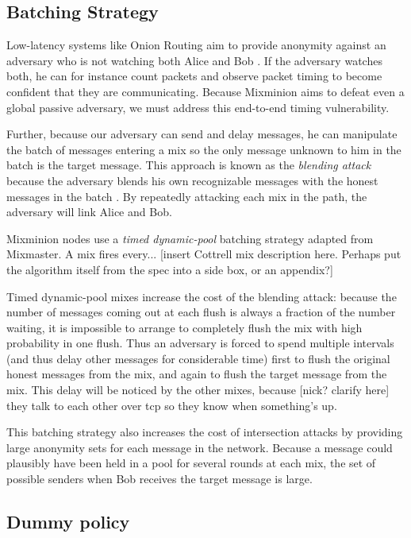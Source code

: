 \documentclass[11pt]{IEEEtran}
\begin{document}
\subsection{Batching Strategy}
\label{subsec:batching}

Low-latency systems like Onion Routing aim to provide anonymity against an
adversary who is not watching both Alice and Bob \cite{onion-routing}. If
the adversary watches both, he can for instance count packets and observe
packet timing to become confident that they are communicating. Because
Mixminion aims to defeat even a global passive adversary, we must address
this end-to-end timing vulnerability.

Further, because our adversary can send and delay messages,
he can manipulate the batch of messages entering a mix so the only message
unknown to him in the batch is the target message. This approach is
known as the \emph{blending attack} because the adversary blends his
own recognizable messages with the honest messages in the batch
\cite{batching-taxonomy}. By repeatedly
attacking each mix in the path, the adversary will link Alice and Bob.

Mixminion nodes use a \emph{timed dynamic-pool} batching strategy
\cite{batching-taxonomy} adapted from Mixmaster. A
mix fires every... [insert Cottrell mix description here. Perhaps put
the algorithm itself from the spec into a side box, or an appendix?]

Timed dynamic-pool mixes increase
the cost of the blending attack: because the number of messages coming
out at each flush is always a fraction of the number waiting, it is
impossible to arrange to completely flush the mix with high probability
in one flush. Thus an adversary is forced to spend multiple intervals
(and thus delay other messages for considerable time) first to flush
the original honest messages from the mix, and again to flush the
target message from the mix. This delay will be noticed by the other
mixes, because [nick? clarify here] they talk to each other over tcp so
they know when something's up.

This batching strategy also increases the cost of intersection attacks by
providing large anonymity sets for each message in the network. Because
a message could plausibly have been held in a pool for several rounds
at each mix, the set of possible senders when Bob receives the target
message is large.

\subsection{Dummy policy}
\end{document}
